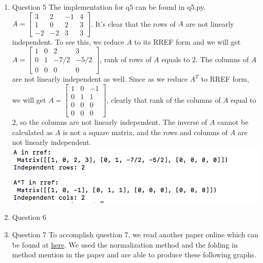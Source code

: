 \documentclass[11pt]{article}
\begin{document}
\begin{enumerate}
\item Question 5\newline
The implementation for q5 can be found in q5.py. $A = \begin{bmatrix} 3 & 2 & -1 & 4 \\ 1 & 0 & 2 & 3 \\ -2 & -2 & 3 & 3\end{bmatrix}$. It's clear that the rows of $A$ are not linearly independent. To see this, we reduce $A$ to its RREF form and we will get $A = \begin{bmatrix} 1 & 0 & 2 & 3 \\ 0 & 1 & -7/2 & -5/2 \\ 0 & 0 & 0 & 0\end{bmatrix}$, rank of rows of $A$ equals to $2$. The columns of $A$ are not linearly independent as well. Since as we reduce $A^T$ to RREF form, we will get $A = \begin{bmatrix} 1 &0 & -1 \\ 0 & 1 & 1 \\ 0 & 0 & 0 \\ 0 & 0 & 0\end{bmatrix}$, clearly that rank of the columns of $A$ equal to $2$, so the columns are not linearly independent. The inverse of $A$ cannot be calculated as $A$ is not a square matrix, and the rows and columns of $A$ are not linearly independent.\\
\includegraphics{q5_result}

\item Question 6\newline

\item Question 7\newline
To accomplish question 7, we read another paper online which can be found at \href{https://drive.google.com/file/d/0BylQe2cRVWE_RmZoUTJYSGZNaXM/view}{here}. We used the normalization method and the folding in method mention in the paper and are able to produce these following graphs.


\end{enumerate}
\end{document}
